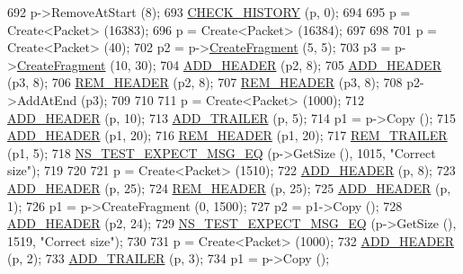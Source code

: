 \begin{DoxyCode}
692   p->RemoveAtStart (8);
693   \hyperlink{packet-metadata-test_8cc_a15a730e778d9d498a39e778bcd39684c}{CHECK\_HISTORY} (p, 0);
694 
695   p = Create<Packet> (16383);
696   p = Create<Packet> (16384);
697 
698 
701   p = Create<Packet> (40);
702   p2 = p->\hyperlink{classns3_1_1Packet_a16f6113606b355b2b346e2245fa2a3d0}{CreateFragment} (5, 5);
703   p3 = p->\hyperlink{classns3_1_1Packet_a16f6113606b355b2b346e2245fa2a3d0}{CreateFragment} (10, 30);
704   \hyperlink{packet-metadata-test_8cc_a120012d48d29d678b3138d5c7b9bf714}{ADD\_HEADER} (p2, 8);
705   \hyperlink{packet-metadata-test_8cc_a120012d48d29d678b3138d5c7b9bf714}{ADD\_HEADER} (p3, 8);
706   \hyperlink{packet-metadata-test_8cc_a8694c61c9ba33c72896dde3628538a84}{REM\_HEADER} (p2, 8);
707   \hyperlink{packet-metadata-test_8cc_a8694c61c9ba33c72896dde3628538a84}{REM\_HEADER} (p3, 8);
708   p2->AddAtEnd (p3);
709 
710 
711   p = Create<Packet> (1000);
712   \hyperlink{packet-metadata-test_8cc_a120012d48d29d678b3138d5c7b9bf714}{ADD\_HEADER} (p, 10);
713   \hyperlink{packet-metadata-test_8cc_ab10bc130bb7184d47509ea44f4fb24df}{ADD\_TRAILER} (p, 5);
714   p1 = p->Copy ();
715   \hyperlink{packet-metadata-test_8cc_a120012d48d29d678b3138d5c7b9bf714}{ADD\_HEADER} (p1, 20);
716   \hyperlink{packet-metadata-test_8cc_a8694c61c9ba33c72896dde3628538a84}{REM\_HEADER} (p1, 20);
717   \hyperlink{packet-metadata-test_8cc_a1e12d07d4d7c9ab1695230cdf925b4d6}{REM\_TRAILER} (p1, 5);
718   \hyperlink{group__testing_ga7304ba46a28d8cf08dfdfd6499cf7068}{NS\_TEST\_EXPECT\_MSG\_EQ} (p->GetSize (), 1015, \textcolor{stringliteral}{"Correct size"});
719 
720 
721   p = Create<Packet> (1510);
722   \hyperlink{packet-metadata-test_8cc_a120012d48d29d678b3138d5c7b9bf714}{ADD\_HEADER} (p, 8);
723   \hyperlink{packet-metadata-test_8cc_a120012d48d29d678b3138d5c7b9bf714}{ADD\_HEADER} (p, 25);
724   \hyperlink{packet-metadata-test_8cc_a8694c61c9ba33c72896dde3628538a84}{REM\_HEADER} (p, 25);
725   \hyperlink{packet-metadata-test_8cc_a120012d48d29d678b3138d5c7b9bf714}{ADD\_HEADER} (p, 1);
726   p1 = p->CreateFragment (0, 1500);
727   p2 = p1->Copy ();
728   \hyperlink{packet-metadata-test_8cc_a120012d48d29d678b3138d5c7b9bf714}{ADD\_HEADER} (p2, 24);
729   \hyperlink{group__testing_ga7304ba46a28d8cf08dfdfd6499cf7068}{NS\_TEST\_EXPECT\_MSG\_EQ} (p->GetSize (), 1519, \textcolor{stringliteral}{"Correct size"});
730 
731   p = Create<Packet> (1000);
732   \hyperlink{packet-metadata-test_8cc_a120012d48d29d678b3138d5c7b9bf714}{ADD\_HEADER} (p, 2);
733   \hyperlink{packet-metadata-test_8cc_ab10bc130bb7184d47509ea44f4fb24df}{ADD\_TRAILER} (p, 3);
734   p1 = p->Copy ();

\end{DoxyCode}
